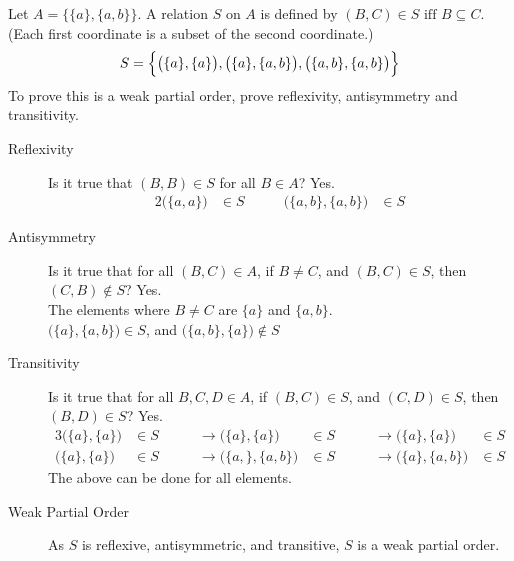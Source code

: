 \documentclass[\main/notes.tex]{subfiles}
\begin{document}
				\begin{example}
					Let $A = \bigl\{\{a\}, \{a, b\}\bigr\}$. A relation $S$ on $A$ is defined by $(B, C) \in S \text{ iff } B \subseteq C$. (Each first coordinate is a subset of the second coordinate.)
					\begin{align*}
						S = \Bigl\{\bigl(\{a\}, \{a\}\bigr), \bigl(\{a\}, \{a, b\}\bigr), \bigl(\{a, b\}, \{a, b\}\bigr)\Bigr\}
					\end{align*}
					To prove this is a weak partial order, prove reflexivity, antisymmetry and transitivity.
					\begin{description}
						\item[Reflexivity] Is it true that $(B, B) \in S$ for all $B \in A$? Yes.
							\begin{alignat*}{2}
								\bigl(\{a, a\}\bigr) &\in S \qquad & \bigl(\{a, b\}, \{a, b\}\bigr) &\in S
							\end{alignat*}
						\item[Antisymmetry] Is it true that for all $(B, C) \in A$, if $B \neq C$, and $(B, C) \in S$, then $(C, B) \notin S$? Yes.\\
							The elements where $B \neq C$ are $\{a\}$ and $\{a, b\}$.\\
							$\bigl(\{a\}, \{a, b\}\bigr) \in S$, and $\bigl(\{a, b\}, \{a\}\bigr) \notin S$
						\item[Transitivity] Is it true that for all $B, C, D \in A$, if $(B, C) \in S$, and $(C, D) \in S$, then $(B, D) \in S$? Yes.
							\begin{alignat*}{3}
								\bigl(\{a\}, \{a\}\bigr) &\in S \qquad &\rightarrow \bigl(\{a\}, \{a\}\bigr) &\in S \qquad &\rightarrow \bigl(\{a\}, \{a\}\bigr) &\in S\\
								\bigl(\{a\}, \{a\}\bigr) &\in S \qquad &\rightarrow \bigl(\{a,\}, \{a, b\}\bigr) &\in S \qquad &\rightarrow \bigl(\{a\}, \{a, b\}\bigr) &\in S
							\end{alignat*}
							The above can be done for all elements.
						\item[Weak Partial Order] As $S$ is reflexive, antisymmetric, and transitive, $S$ is a weak partial order.
					\end{description}
				\end{example}
\end{document}
